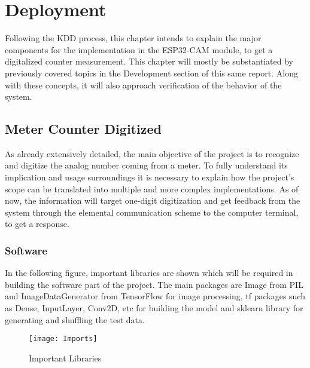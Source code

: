 %
%
%
%

\chapter{Deployment}

Following the KDD process, this chapter intends to explain the major components for the implementation in the ESP32-CAM module, to get a digitalized counter measurement. This chapter will mostly be substantiated by previously covered topics in the Development section of this same report. Along with these concepts, it will also approach verification of the behavior of the system. 

\section{Meter Counter Digitized}
As already extensively detailed, the main objective of the project is to recognize and digitize the analog number coming from a meter. To fully understand its implication and usage surroundings it is necessary to explain how the project's scope can be translated into multiple and more complex implementations. As of now, the information will target one-digit digitization and get feedback from the system through the elemental communication scheme to the computer terminal, to get a response.

\subsection{Software}
In the following figure, important libraries are shown which will be required in building the software part of the project. The main packages are  Image from \ac{PIL} and ImageDataGenerator from TensorFlow for image processing, \ac{tf} packages such as Dense, InputLayer, Conv2D, etc for building the model and sklearn library for generating and shuffling the test data.

\begin{figure}  [H]
	\begin{center}
		\texttt{[image: Imports]}
		\caption{Important Libraries} \label{fig:Imports}
	\end{center}
\end{figure}

